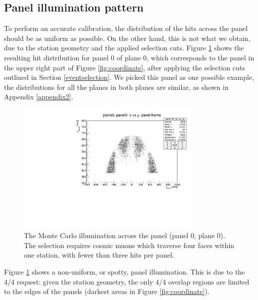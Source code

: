 \subsection{Panel illumination pattern}
To perform an accurate calibration, 
the distribution of the hits across the panel 
should be as
uniform as possible. On the other hand, this is 
not what we obtain, due to the station geometry
and the applied selection cuts. 
Figure \ref{fig:illumination} shows the 
resulting hit distribution for panel 0 of
plane 0, which corresponds 
to the panel in 
the upper right part of Figure \ref{fig:coordinate}, 
after applying the selection cuts 
outlined in Section 
\ref{eventselection}. 
We picked this panel as one possible 
example, the 
distributions for all the planes in 
both planes are similar, as
shown in Appendix \ref{appendix2}.

\begin{figure}[!h]
    \centering
    \includegraphics[width =0.8\textwidth]{figures/pdf/xp_vs_yp_panel0.pdf}
    \caption[Monte Carlo illumination across 
    the panel (panel 0, plane 0).]{
        The Monte Carlo illumination 
        across the panel (panel 0, plane 0).
        The selection requires cosmic muons which 
        traverse four faces within one station, with 
        fewer than three hits per panel.}
    \label{fig:illumination}
\end{figure}
Figure \ref{fig:illumination} shows a 
non-uniform, or spotty, 
panel illumination. This is due to the 4/4 request: 
given the station geometry, the only 4/4 overlap 
regions are 
limited to the edges of the panels (darkest 
areas in Figure \ref{fig:coordinate}). 

